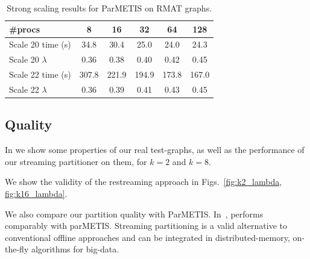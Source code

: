 \begin{table}
\caption{Strong scaling results for ParMETIS on RMAT graphs.}
\centering
\small
{ \begin{tabular}{ l | c | c | c | c | c }    \toprule
\label{table:rmat}
\#procs & 8 & 16 & 32 & 64 & 128 \\ \midrule
Scale 20 time (s) & 34.8 & 30.4 & 25.0 & 24.0 & 24.3 \\%
Scale 20 $\lambda$ & 0.36 & 0.38 & 0.40 & 0.42 & 0.45 \\%
Scale 22 time (s) & 307.8 & 221.9 & 194.9 & 173.8 & 167.0 \\
Scale 22 $\lambda$ & 0.36 & 0.39 & 0.41 & 0.43 & 0.45 \\
\hline
\end{tabular}\par
}
\label{tab:rmatpmstrong}
\end{table}

\subsection{Quality}
In  we show some properties of our real test-graphs, as well as the performance of our streaming partitioner on them, for $k=2$ and $k=8$. 

We show the validity of the restreaming approach in Figs.~\ref{fig:k2_lambda, fig:k16_lambda}.

We also compare our partition quality with ParMETIS.
In~, \ourmethod performs comparably with parMETIS. Streaming partitioning is a valid alternative to conventional offline approaches and can be integrated in distributed-memory, on-the-fly algorithms for big-data.

